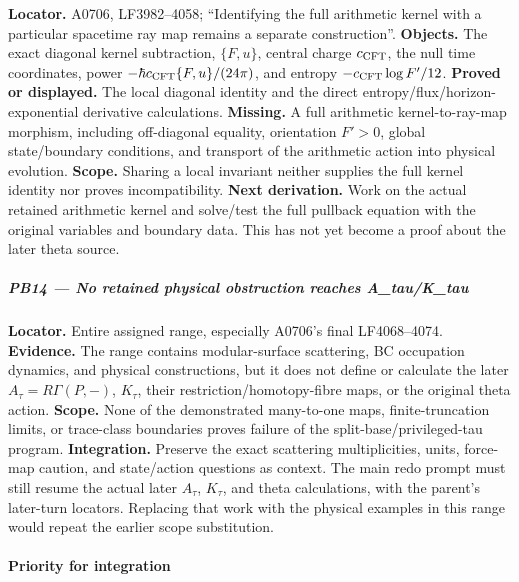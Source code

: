 \textbf{Locator.} A0706, LF3982--4058; ``Identifying the full arithmetic
kernel with a particular spacetime ray map remains a separate
construction''. \textbf{Objects.} The exact diagonal kernel subtraction,
\(\{F,u\}\), central charge \(c_{\rm CFT}\), the null time coordinates,
power \(-\hbar c_{\rm CFT}\{F,u\}/(24\pi)\), and entropy
\(-c_{\rm CFT}\log F'/12\). \textbf{Proved or displayed.} The local
diagonal identity and the direct entropy/flux/horizon-exponential
derivative calculations. \textbf{Missing.} A full arithmetic
kernel-to-ray-map morphism, including off-diagonal equality, orientation
\(F'>0\), global state/boundary conditions, and transport of the
arithmetic action into physical evolution. \textbf{Scope.} Sharing a
local invariant neither supplies the full kernel identity nor proves
incompatibility. \textbf{Next derivation.} Work on the actual retained
arithmetic kernel and solve/test the full pullback equation with the
original variables and boundary data. This has not yet become a proof
about the later theta source.

\subparagraph{PB14 --- No retained physical obstruction reaches
A\_tau/K\_tau}\label{pb14-no-retained-physical-obstruction-reaches-a_tauk_tau}

\textbf{Locator.} Entire assigned range, especially A0706's final
LF4068--4074. \textbf{Evidence.} The range contains modular-surface
scattering, BC occupation dynamics, and physical constructions, but it
does not define or calculate the later \(A_\tau=R\Gamma(P,-)\),
\(K_\tau\), their restriction/homotopy-fibre maps, or the original theta
action. \textbf{Scope.} None of the demonstrated many-to-one maps,
finite-truncation limits, or trace-class boundaries proves failure of
the split-base/privileged-tau program. \textbf{Integration.} Preserve
the exact scattering multiplicities, units, force-map caution, and
state/action questions as context. The main redo prompt must still
resume the actual later \(A_\tau\), \(K_\tau\), and theta calculations,
with the parent's later-turn locators. Replacing that work with the
physical examples in this range would repeat the earlier scope
substitution.

\paragraph{Priority for integration}\label{priority-for-integration}

